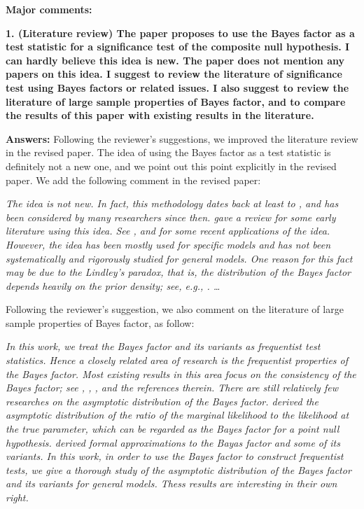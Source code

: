 \documentclass[11pt]{article}
\theoremstyle{plain}
\theoremstyle{definition}
\theoremstyle{remark}
\begin{document}
\textbf{Major comments:}

\textbf{1.
    (Literature review) The paper proposes to use the Bayes factor as a test statistic for a significance test of the composite null hypothesis. I can hardly believe this idea is new. The paper does not mention any papers on this idea. I suggest to review the literature of significance test using Bayes factors or related issues. I also suggest to review the literature of large sample properties of Bayes factor, and to compare the results of this paper with existing results in the literature.
}

\textbf{Answers:}
Following the reviewer's suggestions, we improved the literature review in the revised paper.
The idea of using the Bayes factor as a test statistic is definitely not a new one, and we point out this point explicitly in the revised paper.
We add the following comment in the revised paper:
\begin{adjustwidth}{1.5em}{1.5em}
    \emph{
The idea is not new.                                                                                      
In fact, this methodology dates back at least to \cite{Good1967}, and has been considered by many
researchers since then.
\cite{Good1992} gave a review for some early literature using this idea.                                  
See \cite{Aerts2004}, \cite{zhou2018On} and \cite{Wang2020} for some recent applications of the idea. 
However, the idea has been mostly used for specific models and has not been 
systematically and rigorously studied for general models.                                  
One reason for this fact may be due to the Lindley's paradox, that is, the distribution of the Bayes factor depends heavily on the prior density; see, e.g., \cite{Shafer1982}. \ldots
}
\end{adjustwidth}

Following the reviewer's suggestion, we also comment on the literature of large sample properties of Bayes factor, as follow:
\begin{adjustwidth}{1.5em}{1.5em}
    \emph{
        In this work, we treat the Bayes factor and its variants as frequentist test statistics.
        Hence a closely related area of research is the frequentist properties of the Bayes factor.
        Most existing results in this area focus on the consistency of the Bayes factor; see \cite{berger2003approximations}, \cite{moreno2010},      \cite{WangMin2016}, \cite{Chatterjee2017} and the references therein.
        There are still relatively few researches on the asymptotic distribution of the Bayes factor.
        \cite{clarke1990information} derived the asymptotic distribution of the ratio of the marginal likelihood to the likelihood at the true parameter, which can be regarded as the Bayes factor for a point null hypothesis.
        \cite{Gelfand1994} derived formal approximations to the Bayas factor and some of its variants.
        In this work, in order to use the Bayes factor to construct frequentist tests, we give a thorough study of the asymptotic distribution of the Bayes factor and its variants for general models.
        Thess results are interesting in their own right.
}
\end{adjustwidth}
\end{document}
